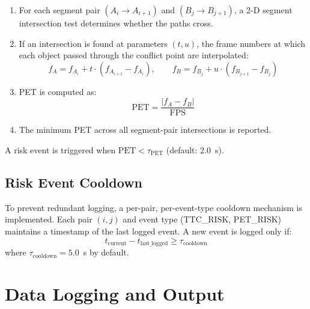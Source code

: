 \documentclass[12pt]{report}
\begin{document}
\begin{enumerate}
    \item For each segment pair $(A_i \to A_{i+1})$ and $(B_j \to B_{j+1})$, a 2-D segment intersection test determines whether the paths cross.
    \item If an intersection is found at parameters $(t, u)$, the frame numbers at which each object passed through the conflict point are interpolated:
    \begin{equation}
        f_A = f_{A_i} + t \cdot (f_{A_{i+1}} - f_{A_i}), \qquad
        f_B = f_{B_j} + u \cdot (f_{B_{j+1}} - f_{B_j})
        \label{eq:pet_interpolation}
    \end{equation}
    \item PET is computed as:
    \begin{equation}
        \text{PET} = \frac{|f_A - f_B|}{\text{FPS}}
        \label{eq:pet}
    \end{equation}
    \item The minimum PET across all segment-pair intersections is reported.
\end{enumerate}

A risk event is triggered when $\text{PET} < \tau_\text{PET}$ (default: 2.0~s).

\subsection{Risk Event Cooldown}

To prevent redundant logging, a per-pair, per-event-type cooldown mechanism is implemented.
Each pair $(i, j)$ and event type (TTC\_RISK, PET\_RISK) maintains a timestamp of the last logged event.
A new event is logged only if:
\begin{equation}
    t_\text{current} - t_\text{last\_logged} \geq \tau_\text{cooldown}
    \label{eq:cooldown}
\end{equation}
where $\tau_\text{cooldown} = 5.0$~s by default.

\section{Data Logging and Output}
\end{document}
